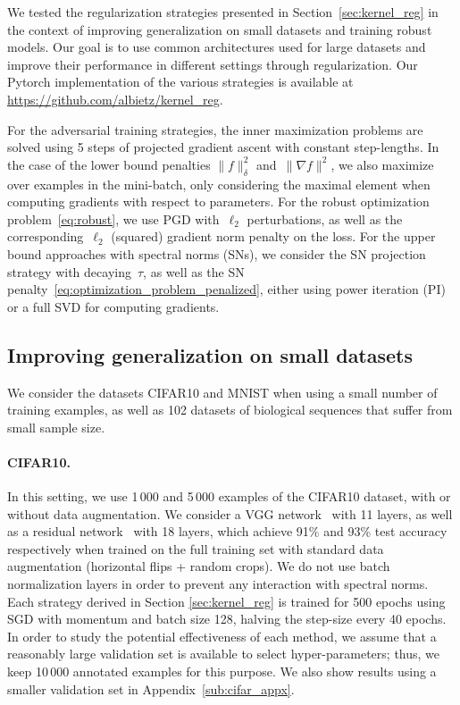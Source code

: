 
We tested the regularization strategies presented in Section~\ref{sec:kernel_reg}
in the context of improving generalization on small datasets and training robust models.
Our goal is to use common architectures used for large datasets and improve
their performance in different settings through regularization.
Our Pytorch implementation of the various strategies is available at \url{https://github.com/albietz/kernel_reg}.

For the adversarial training strategies, the inner maximization problems are solved using 5 steps of projected
gradient ascent with constant step-lengths.
In the case of the lower bound penalties $\|f\|_\delta^2$ and~$\|\nabla f\|^2$,
we also maximize over
examples in the mini-batch, only considering the maximal element when computing gradients with respect to parameters.
For the robust optimization problem~\eqref{eq:robust}, we use PGD with~$\ell_2$
perturbations,
as well as the corresponding~$\ell_2$ (squared) gradient norm penalty on the loss.
For the upper bound approaches with spectral norms (SNs), we consider the SN projection strategy with decaying~$\tau$,
as well as the SN penalty~\eqref{eq:optimization_problem_penalized}, either using power iteration (PI) or a full SVD
for computing gradients.



\subsection{Improving generalization on small datasets}
\label{sub:exp_smalldata}
We consider the datasets CIFAR10 and MNIST when using a small number of training examples,
as well as 102 datasets of biological sequences that suffer from small sample size.

\vspace*{-0.2cm}
\paragraph{CIFAR10.}
In this setting, we use 1\,000 and 5\,000 examples of the CIFAR10 dataset, with or without data augmentation.
We consider a VGG network~\citep{simonyan2014very} with 11 layers,
as well as a residual network~\citep{he2016deep} with 18 layers, which achieve
91\% and 93\% test accuracy respectively when trained on the full training set with standard data augmentation (horizontal flips + random crops).
We do not use batch normalization layers in order to prevent any interaction with spectral norms.
Each strategy derived in Section \ref{sec:kernel_reg} is trained for 500 epochs
using SGD with momentum and batch size 128, halving the step-size every 40 epochs.
In order to study the potential effectiveness of each method, we assume that a reasonably large validation set is
available to select hyper-parameters; thus, we keep 10\,000 annotated examples for this purpose.
We also show results using a smaller validation set in Appendix~\ref{sub:cifar_appx}.

